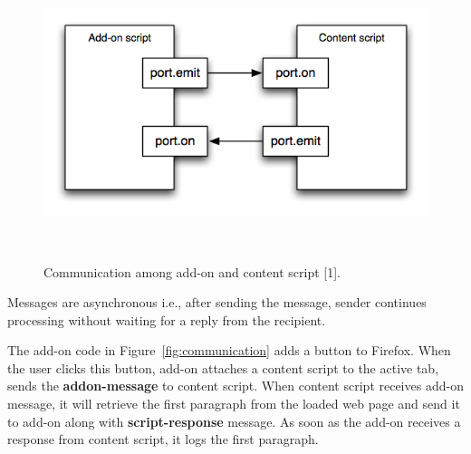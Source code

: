 \begin{figure}
  \centering
      \includegraphics[width=16cm, height=8.65cm]{content-scripting-overview.png}
    \caption[Communication among add-on and content script]{Communication among add-on and content script [1].}
    \label{fig:content-scripting-overview}
\end{figure}

Messages are asynchronous i.e., after sending the message, sender continues processing without waiting for a reply from the recipient.

The add-on code in Figure~\ref{fig:communication} adds a button to Firefox. When the user clicks this button, add-on attaches a content script to the active tab, sends the \textbf{addon-message} to content script. When content script receives add-on message, it will retrieve the first paragraph from the loaded web page and send it to add-on along with \textbf{script-response} message. As soon as the add-on receives a response from content script, it logs the first paragraph.

